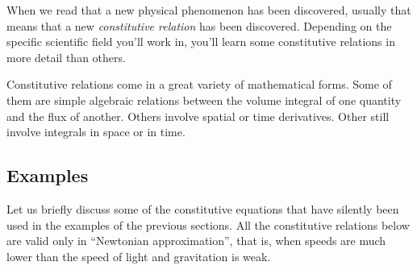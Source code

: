 \documentclass[a4paper,12pt,%
onecolumn,oneside,titlepage,%
british%
]{memoir}
\renewcommand*{\|}[1][]{\nonscript\:#1\vert\nonscript\:\mathopen{}}
\begin{document}
When we read that a new physical phenomenon has been discovered, usually that means that a new \emph{constitutive relation} has been discovered. Depending on the specific scientific field you'll work in, you'll learn some constitutive relations in more detail than others.

Constitutive relations come in a great variety of mathematical forms. Some of them are simple algebraic relations between the volume integral of one quantity and the flux of another. Others involve spatial or time derivatives. Other still involve integrals in space or in time.%

\subsection{Examples}
\label{sec:example_constitutive}

Let us briefly discuss some of the constitutive equations that have silently been used in the examples of the previous sections. All the constitutive relations below are valid only in \enquote{Newtonian approximation}, that is, when speeds are much lower than the speed of light and gravitation is weak.
\end{document}
